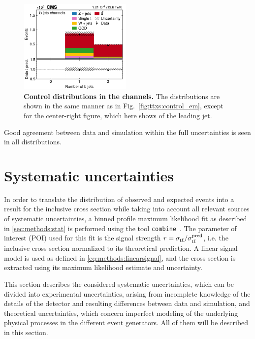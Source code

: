 \begin{figure}[!hp]
\hfill
\includegraphics[width=0.49\textwidth]{figures/ttxs/nbtag_lj.pdf}
\caption{
   \textbf{Control distributions in the \ljets channels.} The distributions are shown in the same manner as in Fig.~\ref{fig:ttxs:control_em}, except for the center-right figure, which here shows \abseta of the leading jet.
}
\label{fig:ttxs:control_ljets}
\end{figure}

Good agreement between data and simulation within the full uncertainties is seen in all distributions.



\section{Systematic uncertainties}
\label{sec:ttxs:systematics}


In order to translate the distribution of observed and expected events into a result for the inclusive \ttbar cross section while taking into account all relevant sources of systematic uncertainties, a binned profile maximum likelihood fit as described in \cref{sec:methods:stat} is performed using the tool \texttt{combine}~\cite{CMS:CAT-23-001}.
The parameter of interest (POI) used for this fit is the signal strength $r = \sigma_{\mathrm{t \bar{t}}} / \sigma_{\mathrm{t \bar{t}}}^{\text{pred}}$, i.e. the inclusive \ttbar cross section normalized to its theoretical prediction. A linear signal model is used as defined in \cref{eq:methods:linearsignal}, and the \ttbar cross section is extracted using its maximum likelihood estimate and uncertainty.

This section describes the considered systematic uncertainties, which can be divided into experimental uncertainties, arising from incomplete knowledge of the details of the detector and resulting differences between data and simulation, and theoretical uncertainties, which concern imperfect modeling of the underlying physical processes in the different event generators. All of them will be described in this section.

